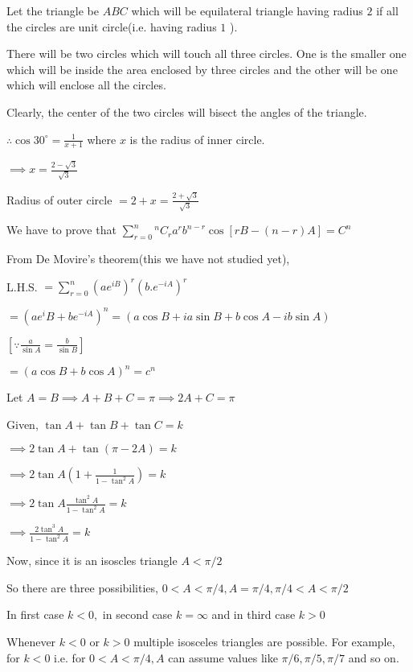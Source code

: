   \startplacefigure
    \externalfigure[22_1.pdf]
  \stopplacefigure

  Let the triangle be $ABC$ which will be equilateral triangle having radius $2$ if all the circles are unit
  circle(i.e. having radius $1$ ).

  There will be two circles which will touch all three circles. One is the smaller one which will be inside the area enclosed by
  three circles and the other will be one which will enclose all the circles.

  Clearly, the center of the two circles will bisect the angles of the triangle.

  $\therefore \cos30^\circ = \frac{1}{x + 1}$ where $x$ is the radius of inner circle.

  $\implies x = \frac{2 - \sqrt{3}}{\sqrt{3}}$

  Radius of outer circle $= 2 + x = \frac{2 + \sqrt{3}}{\sqrt{3}}$

\item We have to prove that $\sum_{r=0}^n{}^nC_ra^rb^{n - r}\cos[rB - (n - r)A] = C^n$

  From De Movire's theorem(this we have not studied yet),

  L.H.S. $= \sum_{r = 0}^n(ae^{iB})^r(b.e^{-iA})^r$

  $= (ae^iB + be^{-iA})^n = (a\cos B + ia\sin B + b\cos A - ib\sin A)$

  $\left[\because \frac{a}{\sin A} = \frac{b}{\sin B}\right]$

  $= (a\cos B + b\cos A)^n = c^n$

\item Let $A = B \implies A + B + C = \pi \implies 2A + C = \pi$

  Given, $\tan A +\tan B + \tan C = k$

  $\implies 2\tan A + \tan(\pi - 2A) = k$

  $\implies 2\tan A\left(1 + \frac{1}{1 - \tan^2A}\right) = k$

  $\implies 2\tan A\frac{\tan^2A}{1 - \tan^2A} = k$

  $\implies \frac{2\tan^3A}{1 - \tan^2A} = k$

  Now, since it is an isoscles triangle $A < \pi/2$

  So there are three possibilities, $0 < A < \pi/4, A=\pi/4, \pi/4 < A < \pi/2$

  In first case $k < 0,$ in second case $k=\infty$ and in third case $k > 0$

  Whenever $k<0$ or $k>0$ multiple isosceles triangles are possible. For example, for $k < 0$
  i.e. for $0 < A < \pi/4, A$ can assume values like $\pi/6, \pi/5, \pi/7$ and so on.

